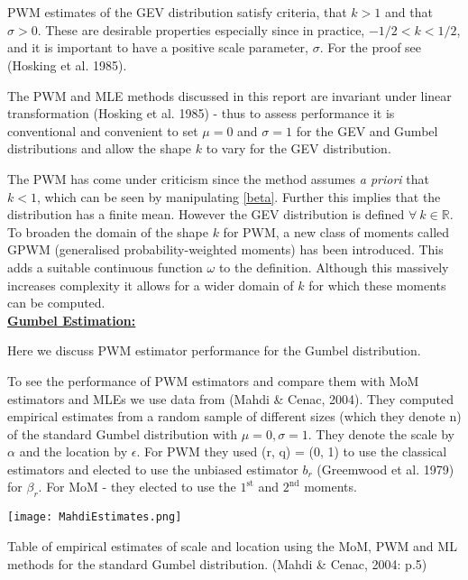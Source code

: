 \documentclass{article}
\begin{document}
PWM estimates of the GEV distribution satisfy criteria, that $\hat{k} > 1$ and that $\hat{\sigma} > 0$. These are desirable properties especially since in practice, $-1/2 < k < 1/2$, and it is important to have a positive scale parameter, $\sigma$. For the proof see (Hosking et al. 1985).

The PWM and MLE methods discussed in this report are invariant under linear transformation (Hosking et al. 1985) - thus to assess performance it is conventional and convenient to set $\mu = 0$ and $\sigma = 1$ for the GEV and Gumbel distributions and allow the shape $k$ to vary for the GEV distribution.

The PWM has come under criticism  since the method assumes \textit{a priori} that $k<1$, which can be seen by manipulating \eqref{beta}. Further this implies that the distribution has a finite mean. However the GEV distribution is defined $\forall \ k \in \mathbb{R}$. To broaden the domain of the shape $k$ for PWM, a new class of moments called GPWM (generalised probability-weighted moments) has been introduced. This adds a suitable continuous function $\omega$ to the definition. Although this massively increases complexity it allows for a wider domain of $k$ for which these moments can be computed.\\

\underline{\textbf{Gumbel Estimation:}}

Here we discuss PWM estimator performance for the Gumbel distribution.

To see the performance of PWM estimators and compare them with MoM estimators and MLEs we use data from (Mahdi \& Cenac, 2004). They computed empirical estimates from a random sample of different sizes (which they denote n) of the standard Gumbel distribution with $\mu = 0, \sigma = 1$. They denote the scale by $\alpha$ and the location by $\epsilon$. For PWM they used (r, q) = (0, 1) to use the classical estimators and elected to use the unbiased estimator $b_r$ (Greemwood et al. 1979) for $\beta_r$. For MoM - they elected to use the $1^{\text{st}}$ and $2^{\text{nd}}$ moments.

\texttt{[image: MahdiEstimates.png]}\vspace{-0.5cm}

\small{Table of empirical estimates of scale and location using the MoM, PWM and ML methods for the standard Gumbel distribution. (Mahdi \& Cenac, 2004: p.5)}\vspace{-0.2cm}
\end{document}
